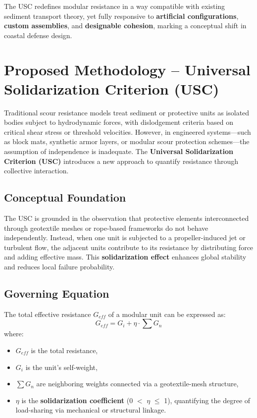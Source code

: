 \documentclass[Journal,letterpaper]{ascelike-new}
\begin{document}
The USC redefines modular resistance in a way compatible with existing sediment transport theory, yet fully responsive to \textbf{artificial configurations}, \textbf{custom assemblies}, and \textbf{designable cohesion}, marking a conceptual shift in coastal defense design.


\section{Proposed Methodology -- Universal Solidarization Criterion (USC)}

Traditional scour resistance models treat sediment or protective units as isolated bodies subject to hydrodynamic forces, with dislodgement criteria based on critical shear stress or threshold velocities. However, in engineered systems---such as block mats, synthetic armor layers, or modular scour protection schemes---the assumption of independence is inadequate. The \textbf{Universal Solidarization Criterion (USC)} introduces a new approach to quantify resistance through collective interaction.

\subsection{Conceptual Foundation}

The USC is grounded in the observation that protective elements interconnected through geotextile meshes or rope-based frameworks do not behave independently. Instead, when one unit is subjected to a propeller-induced jet or turbulent flow, the adjacent units contribute to its resistance by distributing force and adding effective mass. This \textbf{solidarization effect} enhances global stability and reduces local failure probability.

\subsection{Governing Equation}

The total effective resistance $G_{eff}$ of a modular unit can be expressed as:
\[G_{eff}=G_i+\eta \cdot \sum{G_n}\]
where:

\begin{itemize}
\item  $G_{eff}$ is the total resistance,

\item  $G_i$ is the unit's self-weight,

\item  $\sum{G_n}$ are neighboring weights connected via a geotextile-mesh structure,

\item  $\eta $ is the \textbf{solidarization coefficient} (0 $\mathrm{<}$ $\eta $ $\mathrm{\le}$ 1), quantifying the degree of load-sharing via mechanical or structural linkage.
\end{itemize}
\end{document}
